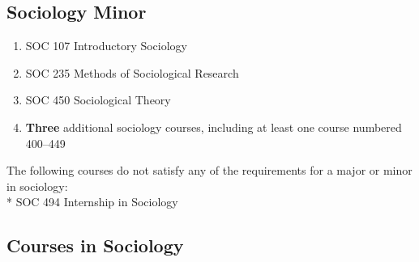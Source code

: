\documentclass[
  letterpaper,
]{scrbook}
\providecommand{\tightlist}{%
  \setlength{\itemsep}{0pt}\setlength{\parskip}{0pt}}
\begin{document}
\subsection{Sociology Minor}\label{sociology-minor}

\begin{enumerate}
\def\labelenumi{\arabic{enumi}.}
\tightlist
\item
  SOC 107 Introductory Sociology\\
\item
  SOC 235 Methods of Sociological Research\\
\item
  SOC 450 Sociological Theory\\
\item
  \textbf{Three} additional sociology courses, including at least one
  course numbered 400--449
\end{enumerate}

The following courses do not satisfy any of the requirements for a major
or minor in sociology:\\
* SOC 494 Internship in Sociology

\subsection{Courses in Sociology}\label{courses-in-sociology}
\end{document}
